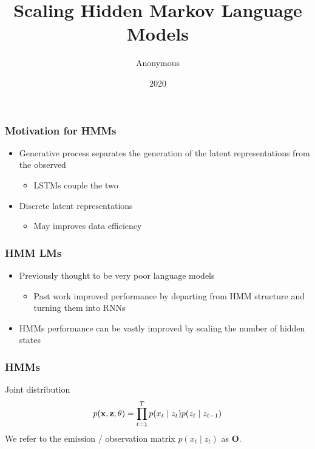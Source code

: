 \documentclass{beamer}
\title{Scaling Hidden Markov Language Models}
\author{Anonymous}
\date{2020}
\begin{document}
\frame{\titlepage}

\begin{frame}
\frametitle{Motivation for HMMs}
\begin{itemize}
\item Generative process separates the generation of the latent representations from the observed
    \begin{itemize}
    \item LSTMs couple the two
    \end{itemize}
\item Discrete latent representations
    \begin{itemize}
    \item May improves data efficiency \citep{jin2020discretelv}
    \end{itemize}
\end{itemize}
\end{frame}

\begin{frame}
\frametitle{HMM LMs}
\begin{itemize}
\item Previously thought to be very poor language models 
    \begin{itemize}
    \item Past work improved performance by departing from HMM structure
        and turning them into RNNs \citep{buys2018hmm}
    \end{itemize}
\item HMMs performance can be vastly improved by scaling the number of hidden states
\end{itemize}
\end{frame}

\begin{frame}
\frametitle{HMMs}

\begin{center}
\end{center}


Joint distribution
\begin{equation*}
p(\mathbf{x}, \mathbf{z}; \theta)
= \prod_{t=1}^T p(x_t\mid z_t)p(z_t \mid z_{t-1})
\end{equation*}
We refer to the emission / observation matrix $p(x_t \mid z_t)$ as $\mathbf{O}$.
\end{frame}
\end{document}
